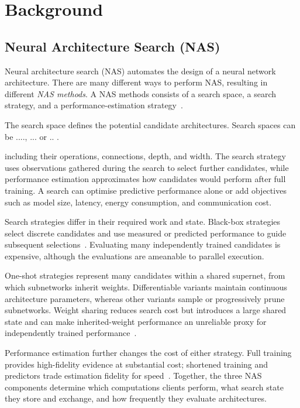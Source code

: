 \section{Background}
\subsection{Neural Architecture Search (NAS)}

Neural architecture search (NAS) automates the design of a neural network architecture. There are many different ways to perform NAS, resulting in different \textit{NAS methods}. A NAS methods consists of a search space, a search strategy, and a performance-estimation strategy~\cite{nas_survey_2019,nas_1000_papers_2023}. 

The search space defines the potential candidate architectures. Search spaces can be ...., ... or .. .

including their operations, connections, depth, and width. The search strategy uses observations gathered during the search to select further candidates, while performance estimation approximates how candidates would perform after full training. A search can optimise predictive performance alone or add objectives such as model size, latency, energy consumption, and communication cost.

Search strategies differ in their required work and state. Black-box strategies select discrete candidates and use measured or predicted performance to guide subsequent selections~\cite{nas_1000_papers_2023}. Evaluating many independently trained candidates is expensive, although the evaluations are ameanable to parallel execution.

One-shot strategies represent many candidates within a shared supernet, from which subnetworks inherit weights. Differentiable variants maintain continuous architecture parameters, whereas other variants sample or progressively prune subnetworks. Weight sharing reduces search cost but introduces a large shared state and can make inherited-weight performance an unreliable proxy for independently trained performance~\cite{nas_1000_papers_2023}.

Performance estimation further changes the cost of either strategy. Full training provides high-fidelity evidence at substantial cost; shortened training and predictors trade estimation fidelity for speed~\cite{nas_1000_papers_2023}. Together, the three NAS components determine which computations clients perform, what search state they store and exchange, and how frequently they evaluate architectures.

